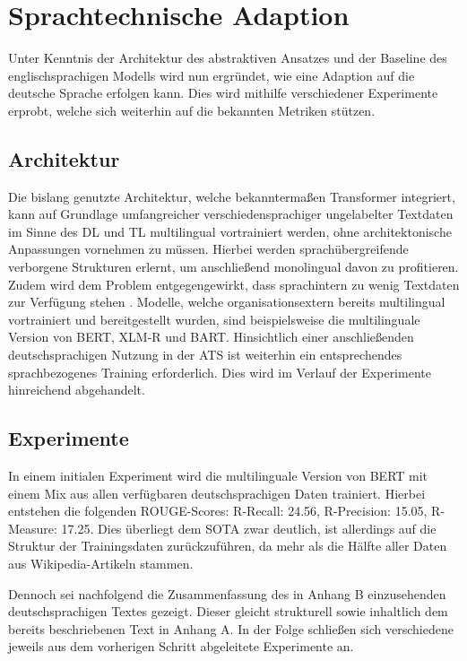 \chapter{Sprachtechnische Adaption}
\thispagestyle{fancy}
\label{chap:Sprachtechnische Adaption}

\noindent
Unter Kenntnis der Architektur des abstraktiven Ansatzes und der Baseline des englischsprachigen Modells wird nun ergründet, wie eine Adaption auf die deutsche Sprache erfolgen kann. Dies wird mithilfe verschiedener Experimente erprobt, welche sich weiterhin auf die bekannten Metriken stützen.


\section{Architektur}
\noindent
Die bislang genutzte Architektur, welche bekanntermaßen Transformer integriert, kann auf Grundlage umfangreicher verschiedensprachiger ungelabelter Textdaten im Sinne des \ac{DL} und \ac{TL} multilingual vortrainiert werden, ohne architektonische Anpassungen vornehmen zu müssen. Hierbei werden sprachübergreifende verborgene Strukturen erlernt, um anschließend monolingual davon zu profitieren. Zudem wird dem Problem entgegengewirkt, dass sprachintern zu wenig Textdaten zur Verfügung stehen \cite{MOB20}. Modelle, welche organisationsextern bereits multilingual vortrainiert und bereitgestellt wurden, sind beispielsweise die multilinguale Version von \ac{BERT}, \ac{XLM-R} und \ac{BART}. Hinsichtlich einer anschließenden deutschsprachigen Nutzung in der \ac{ATS} ist weiterhin ein entsprechendes sprachbezogenes Training erforderlich. Dies wird im Verlauf der Experimente hinreichend abgehandelt.


\section{Experimente}
\noindent
In einem initialen Experiment wird die multilinguale Version von \ac{BERT} mit einem Mix aus allen verfügbaren deutschsprachigen Daten trainiert. Hierbei entstehen die folgenden \ac{ROUGE}-Scores: R-Recall: 24.56, R-Precision: 15.05, R-Measure: 17.25. Dies überliegt dem \ac{SOTA} zwar deutlich, ist allerdings auf die Struktur der Trainingsdaten zurückzuführen, da mehr als die Hälfte aller Daten aus Wikipedia-Artikeln stammen.
\newpage

\noindent
Dennoch sei nachfolgend die Zusammenfassung des in Anhang B einzusehenden deutschsprachigen Textes gezeigt. Dieser gleicht strukturell sowie inhaltlich dem bereits beschriebenen Text in Anhang A. In der Folge schließen sich verschiedene jeweils aus dem vorherigen Schritt abgeleitete Experimente an.\\

